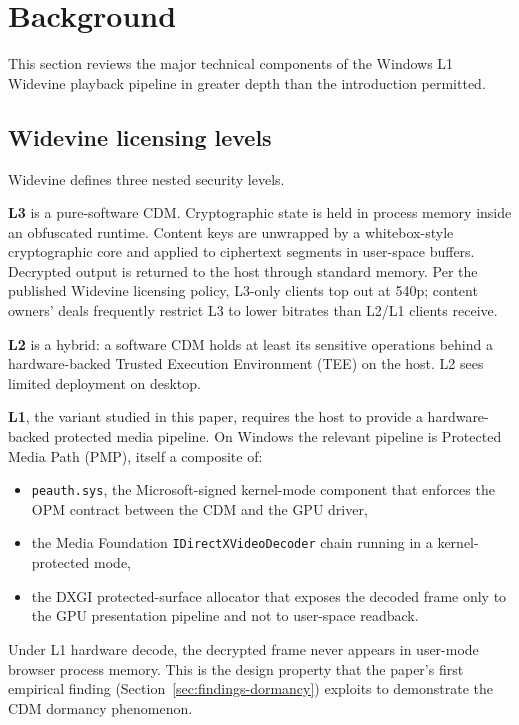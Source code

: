 \documentclass[11pt,letterpaper]{article}
\begin{document}
\section{Background}
\label{sec:background}

This section reviews the major technical components of the
Windows L1 Widevine playback pipeline in greater depth than the
introduction permitted.

\subsection{Widevine licensing levels}
\label{sec:bg-levels}

Widevine defines three nested security levels.

\textbf{L3} is a pure-software CDM. Cryptographic state is held in
process memory inside an obfuscated runtime. Content keys are
unwrapped by a whitebox-style cryptographic core and applied to
ciphertext segments in user-space buffers. Decrypted output is
returned to the host through standard memory. Per the published
Widevine licensing policy, L3-only clients top out at 540p; content
owners' deals frequently restrict L3 to lower bitrates than L2/L1
clients receive.

\textbf{L2} is a hybrid: a software CDM holds at least its
sensitive operations behind a hardware-backed Trusted Execution
Environment (TEE) on the host. L2 sees limited deployment on
desktop.

\textbf{L1}, the variant studied in this paper, requires the host
to provide a hardware-backed protected media pipeline. On Windows
the relevant pipeline is Protected Media Path (PMP), itself a
composite of:

\begin{itemize}[itemsep=0pt,topsep=2pt]
  \item \texttt{peauth.sys}, the Microsoft-signed kernel-mode
        component that enforces the OPM contract between the CDM
        and the GPU driver,
  \item the Media Foundation \texttt{IDirectXVideoDecoder} chain
        running in a kernel-protected mode,
  \item the DXGI protected-surface allocator that exposes the
        decoded frame only to the GPU presentation pipeline and not
        to user-space readback.
\end{itemize}

Under L1 hardware decode, the decrypted frame never appears in
user-mode browser process memory. This is the design property that
the paper's first empirical finding (Section~\ref{sec:findings-dormancy})
exploits to demonstrate the CDM dormancy phenomenon.
\end{document}
